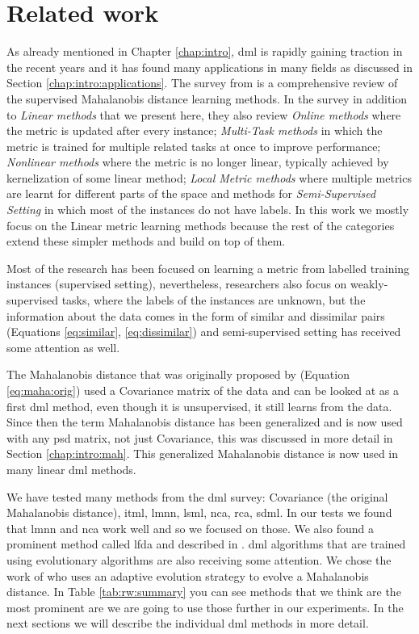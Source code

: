 \documentclass[12pt,a4paper]{report}
\begin{document}
\chapter{Related work} \label{chap:rw}

As already mentioned in Chapter \ref{chap:intro}, \acl{dml} is rapidly gaining traction in the recent years and it has found many applications in many fields as discussed in Section \ref{chap:intro:applications}. The survey from \cite{bellet2013survey} is a comprehensive review of the supervised Mahalanobis distance learning methods. In the survey in addition to \textit{Linear methods} that we present here, they also review \textit{Online methods} where the metric is updated after every instance; \textit{Multi-Task methods} in which the metric is trained for multiple related tasks at once to improve performance; \textit{Nonlinear methods} where the metric is no longer linear, typically achieved by kernelization of some linear method; \textit{Local Metric methods} where multiple metrics are learnt for different parts of the space and methods for \textit{Semi-Supervised Setting} in which most of the instances do not have labels. In this work we mostly focus on the Linear metric learning methods because the rest of the categories extend these simpler methods and build on top of them.

Most of the research has been focused on learning a metric from labelled training instances (supervised setting), nevertheless, researchers also focus on weakly-supervised tasks, where the labels of the instances are unknown, but the information about the data comes in the form of similar and dissimilar pairs (Equations \ref{eq:similar}, \ref{eq:dissimilar}) and semi-supervised setting has received some attention as well.

The Mahalanobis distance that was originally proposed by \cite{mahalanobis1936generalized} (Equation \ref{eq:maha:orig}) used a Covariance matrix of the data and can be looked at as a first \acl{dml} method, even though it is unsupervised, it still learns from the data. Since then the term Mahalanobis distance has been generalized and is now used with any \ac{psd} matrix, not just Covariance, this was discussed in more detail in Section \ref{chap:intro:mah}. This generalized Mahalanobis distance is now used in many linear \acl{dml} methods.

We have tested many methods from the \ac{dml} survey: Covariance (the original Mahalanobis distance), \ac{itml}, \ac{lmnn}, \ac{lsml}, \ac{nca}, \ac{rca}, \ac{sdml}. In our tests we found that \ac{lmnn} and \ac{nca} work well and so we focused on those. We also found a prominent method called \ac{lfda} and described in \cite{sugiyama2007dimensionality}. \Acl{dml} algorithms that are trained using evolutionary algorithms are also receiving some attention. We chose the work of \cite{fukui2013evolutionary} who uses an adaptive evolution strategy to evolve a Mahalanobis distance. In Table \ref{tab:rw:summary} you can see methods that we think are the most prominent are we are going to use those further in our experiments. In the next sections we will describe the individual \acl{dml} methods in more detail.
\end{document}
